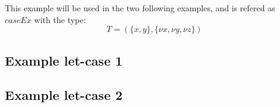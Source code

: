\documentclass[../../master.tex]{subfiles}
\begin{document}
\begin{landscape}
This example will be used in the two following examples, and is refered as $caseEx$ with the type:
$$T=(\{x,y\},\{\nu x, \nu y, \nu z\})$$
\newpage

\subsection{Example let-case 1}
\begin{figure}[H]
	\setlength\tabcolsep{8pt}
	
	\label{fig:LetCase1}
\end{figure}

\subsection{Example let-case 2}
\begin{figure}[H]
	\setlength\tabcolsep{8pt}
	
	\label{fig:LetCase1}
\end{figure}
\end{landscape}
\end{document}
